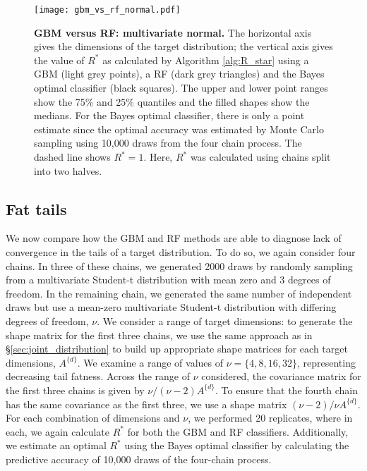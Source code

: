 \documentclass{article}
\begin{document}
\begin{figure}[!htb]
	\centerline{\texttt{[image: gbm\_vs\_rf\_normal.pdf]}}
	\caption{\textbf{GBM versus RF: multivariate normal.} The horizontal axis gives the dimensions of the target distribution; the vertical axis gives the value of $R^*$ as calculated by Algorithm \ref{alg:R_star} using a GBM (light grey points), a RF (dark grey triangles) and the Bayes optimal classifier (black squares). The upper and lower point ranges show the 75\% and 25\% quantiles and the filled shapes show the medians. For the Bayes optimal classifier, there is only a point estimate since the optimal accuracy was estimated by Monte Carlo sampling using 10,000 draws from the four chain process. The dashed line shows $R^*=1$. Here, $R^*$ was calculated using chains split into two halves.}
	\label{fig:gbm_vs_rf_normal}
\end{figure}

\subsection{Fat tails}\label{sec:tail_fatness}
We now compare how the GBM and RF methods are able to diagnose lack of convergence in the tails of a target distribution. To do so, we again consider four chains. In three of these chains, we generated 2000 draws by randomly sampling from a multivariate Student-t distribution with mean zero and 3 degrees of freedom. In the remaining chain, we generated the same number of independent draws but use a mean-zero multivariate Student-t distribution with differing degrees of freedom, $\nu$. We consider a range of target dimensions: to generate the shape matrix for the first three chains, we use the same approach as in \S\ref{sec:joint_distribution} to build up appropriate shape matrices for each target dimensions, $A^{\{d\}}$. We examine a range of values of $\nu=\{4, 8, 16, 32\}$, representing decreasing tail fatness. Across the range of $\nu$ considered, the covariance matrix for the first three chains is given by $\nu/{(\nu-2)} A^{\{d\}}$. To ensure that the fourth chain has the same covariance as the first three, we use a shape matrix ${(\nu-2)}/\nu A^{\{d\}}$. For each combination of dimensions and $\nu$, we performed 20 replicates, where in each, we again calculate $R^*$ for both the GBM and RF classifiers. Additionally, we estimate an optimal $R^*$ using the Bayes optimal classifier by calculating the predictive accuracy of 10,000 draws of the four-chain process.
\end{document}
